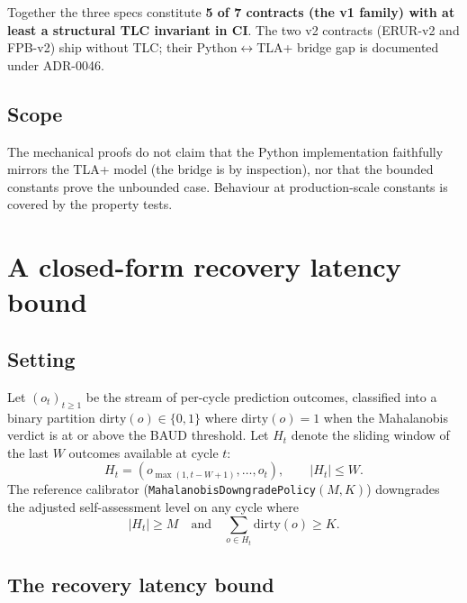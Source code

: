 \documentclass[11pt,a4paper]{article}
\begin{document}
Together the three specs constitute \textbf{5 of 7 contracts
(the v1 family) with at least a structural TLC invariant in CI}.
The two v2 contracts (ERUR-v2 and FPB-v2) ship without TLC; their
Python$\leftrightarrow$TLA+ bridge gap is documented under
ADR-0046.

\subsection{Scope}
The mechanical proofs do not claim that the Python implementation
faithfully mirrors the TLA+ model (the bridge is by inspection),
nor that the bounded constants prove the unbounded case. Behaviour
at production-scale constants is covered by the property tests.

\section{A closed-form recovery latency bound}
\label{sec:theorem}

\subsection{Setting}
Let $(o_t)_{t\ge 1}$ be the stream of per-cycle prediction
outcomes, classified into a binary partition
$\mathrm{dirty}(o) \in \{0,1\}$ where $\mathrm{dirty}(o) = 1$ when
the Mahalanobis verdict is at or above the BAUD threshold. Let
$H_t$ denote the sliding window of the last $W$ outcomes available
at cycle $t$:
\begin{equation}
H_t = (o_{\max(1, t-W+1)}, \ldots, o_t), \qquad |H_t| \le W.
\end{equation}
The reference calibrator (\texttt{MahalanobisDowngradePolicy}$(M,K)$)
downgrades the adjusted self-assessment level on any cycle where
\begin{equation}\label{eq:cond1}
|H_t| \ge M \quad \text{and} \quad \sum_{o \in H_t} \mathrm{dirty}(o) \ge K.
\end{equation}

\subsection{The recovery latency bound}
\label{sec:rlb-bound}
\end{document}
